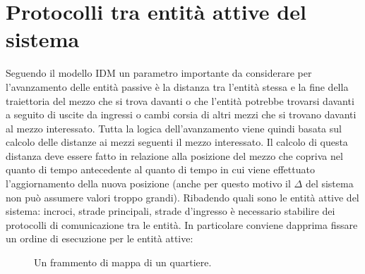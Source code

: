 \newpage
\section{Protocolli tra entità attive del sistema}
Seguendo il modello \ac{IDM} un parametro importante da considerare per
l'avanzamento delle entità passive è la distanza tra l'entità stessa e la fine
della traiettoria del mezzo che si trova davanti o che l'entità potrebbe
trovarsi davanti a seguito di uscite da ingressi o cambi corsia di altri mezzi
che si trovano davanti al mezzo interessato. Tutta la logica dell'avanzamento
viene quindi basata sul calcolo delle distanze ai mezzi seguenti il mezzo
interessato. Il calcolo di questa distanza deve essere fatto in relazione alla
posizione del mezzo che copriva nel quanto di tempo antecedente al quanto di
tempo in cui viene effettuato l'aggiornamento della nuova posizione (anche per
questo motivo il $\Delta$ del sistema non può assumere valori troppo grandi).
Ribadendo quali sono le entità attive del sistema: incroci, strade principali,
strade d'ingresso è necessario stabilire dei protocolli di comunicazione tra le
entità. In particolare conviene dapprima fissare un ordine di esecuzione per le
entità attive:

\begin{figure}[H] %
\caption{Un frammento di mappa di un quartiere.}
\label{fig:Un frammento di mappa di un quartiere}
\end{figure}

